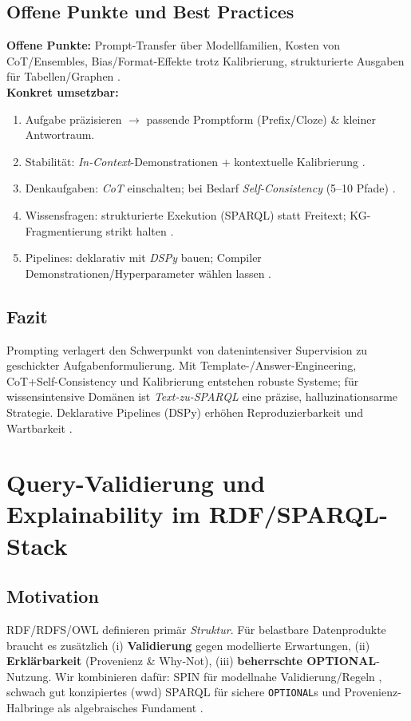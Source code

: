 \subsection{Offene Punkte und Best Practices}
\textbf{Offene Punkte:} Prompt-Transfer über Modellfamilien, Kosten von CoT/Ensembles, Bias/Format-Effekte trotz Kalibrierung, strukturierte Ausgaben für Tabellen/Graphen \cite{liu2023survey,zhao2021calibrate}.\\
\textbf{Konkret umsetzbar:}
\begin{enumerate}
  \item Aufgabe präzisieren $\rightarrow$ passende Promptform (Prefix/Cloze) \& kleiner Antwortraum.
  \item Stabilität: \emph{In-Context}-Demonstrationen + kontextuelle Kalibrierung \cite{zhao2021calibrate}.
  \item Denkaufgaben: \emph{CoT} einschalten; bei Bedarf \emph{Self-Consistency} (5–10 Pfade) \cite{wei2022cot,wang2022selfconsistency}.
  \item Wissensfragen: strukturierte Exekution (SPARQL) statt Freitext; KG-Fragmentierung strikt halten \cite{avila2024autokgqagpt}.
  \item Pipelines: deklarativ mit \emph{DSPy} bauen; Compiler Demonstrationen/Hyperparameter wählen lassen \cite{khattab2023dspy}.
\end{enumerate}

\subsection{Fazit}
Prompting verlagert den Schwerpunkt von datenintensiver Supervision zu geschickter Aufgabenformulierung. Mit Template-/Answer-Engineering, CoT+Self-Consistency und Kalibrierung entstehen robuste Systeme; für wissensintensive Domänen ist \emph{Text-zu-SPARQL} eine präzise, halluzinationsarme Strategie. Deklarative Pipelines (DSPy) erhöhen Reproduzierbarkeit und Wartbarkeit \cite{liu2023survey,wei2022cot,wang2022selfconsistency,zhao2021calibrate,avila2024autokgqagpt,khattab2023dspy}.






\section{Query-Validierung und Explainability im RDF/SPARQL-Stack}
\label{chap:Query-validation-explainability}

\subsection{Motivation}
RDF/RDFS/OWL definieren primär \emph{Struktur}. Für belastbare Datenprodukte braucht es zusätzlich (i) \textbf{Validierung} gegen modellierte Erwartungen, (ii) \textbf{Erklärbarkeit} (Provenienz \& Why-Not), (iii) \textbf{beherrschte OPTIONAL}-Nutzung. Wir kombinieren dafür: SPIN für modellnahe Validierung/Regeln \cite{spin-w3c}, schwach gut konzipiertes (wwd) SPARQL für sichere \texttt{OPTIONAL}s \cite{kaminski-kostylev-beyond-well-designed} und Provenienz-Halbringe als algebraisches Fundament \cite{green-provenance-semirings,herschel-why-why-not,herschel-survey}.

